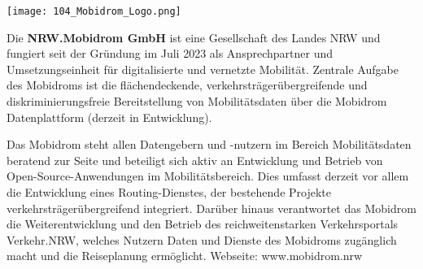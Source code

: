\begin{flushright}
\texttt{[image: 104\_Mobidrom\_Logo.png]}
\end{flushright}
\noindent
Die {\bfseries NRW.Mobidrom GmbH} ist eine Gesellschaft des Landes NRW und fungiert seit der Gründung im Juli 2023 als Ansprechpartner und Umsetzungseinheit für digitalisierte und vernetzte Mobilität. Zentrale Aufgabe des Mobidroms ist die flächendeckende, verkehrsträgerübergreifende und diskriminierungsfreie Bereitstellung von Mobilitätsdaten über die Mobidrom Datenplattform (derzeit in Entwicklung).

\noindent
Das Mobidrom steht allen Datengebern und -nutzern im Bereich Mobilitätsdaten beratend zur Seite und beteiligt sich aktiv an Entwicklung und Betrieb von Open-Source-Anwendungen im Mobilitätsbereich. Dies umfasst derzeit vor allem die Entwicklung eines Routing-Dienstes, der bestehende Projekte verkehrsträgerübergreifend integriert. Darüber hinaus verantwortet das Mobidrom die Weiterentwicklung und den Betrieb des reichweitenstarken Verkehrsportals Verkehr.NRW, welches Nutzern Daten und Dienste des Mobidroms zugänglich macht und die Reiseplanung ermöglicht. Webseite: www.mobidrom.nrw


